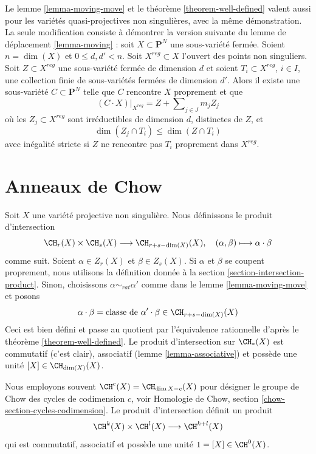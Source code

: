 \begin{remark}
\label{remark-quasi-projective}
Le lemme \ref{lemma-moving-move} et le
théorème \ref{theorem-well-defined}
valent aussi pour les variétés quasi-projectives non singulières, avec
la même démonstration. La seule modification consiste à démontrer la version suivante
du lemme de déplacement \ref{lemma-moving} : soit $X \subset \mathbf{P}^N$
une sous-variété fermée. Soient $n = \dim(X)$ et $0 \leq d, d' < n$. Soit
$X^{reg} \subset X$ l'ouvert des points non singuliers. Soit
$Z \subset X^{reg}$ une sous-variété fermée de dimension $d$ et soient
$T_i \subset X^{reg}$, $i \in I$, une collection finie de sous-variétés fermées
de dimension $d'$. Alors il existe une sous-variété $C \subset \mathbf{P}^N$
telle que $C$ rencontre $X$ proprement et que
$$
(C \cdot X)|_{X^{reg}} = Z + \sum\nolimits_{j \in J} m_j Z_j
$$
où les $Z_j \subset X^{reg}$ sont irréductibles de dimension $d$, distinctes
de $Z$, et
$$
\dim(Z_j \cap T_i) \leq \dim(Z \cap T_i)
$$
avec inégalité stricte si $Z$ ne rencontre pas $T_i$ proprement dans $X^{reg}$.
\end{remark}



\section{Anneaux de Chow}
\label{section-chow-rings}

\noindent
Soit $X$ une variété projective non singulière. Nous définissons le produit
d'intersection
$$
\CH_r(X) \times \CH_s(X) \longrightarrow \CH_{r + s - \dim(X)}(X),\quad
(\alpha, \beta) \longmapsto \alpha \cdot \beta
$$
comme suit. Soient $\alpha \in Z_r(X)$ et $\beta \in Z_s(X)$.
Si $\alpha$ et $\beta$ se coupent proprement, nous utilisons la
définition donnée à la section \ref{section-intersection-product}.
Sinon, choisissons $\alpha \sim_{rat} \alpha'$ comme dans le
lemme \ref{lemma-moving-move} et posons
$$
\alpha \cdot \beta =
\text{classe de }\alpha' \cdot \beta \in \CH_{r + s - \dim(X)}(X)
$$
Ceci est bien défini et passe au quotient par l'équivalence rationnelle d'après le
théorème \ref{theorem-well-defined}. Le produit d'intersection
sur $\CH_*(X)$ est commutatif (c'est clair), associatif
(lemme \ref{lemma-associative}) et possède une unité $[X] \in \CH_{\dim(X)}(X)$.

\medskip\noindent
Nous employons souvent $\CH^c(X) = \CH_{\dim X - c}(X)$ pour désigner le groupe de Chow des
cycles de codimension $c$, voir
Homologie de Chow, section \ref{chow-section-cycles-codimension}.
Le produit d'intersection définit un produit
$$
\CH^k(X) \times \CH^l(X) \longrightarrow \CH^{k + l}(X)
$$
qui est commutatif, associatif et possède une unité $1 = [X] \in \CH^0(X)$.


